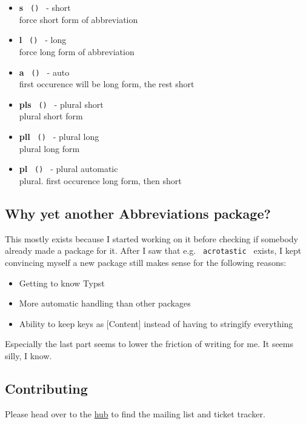 \begin{itemize}
\tightlist
\item
  \textbf{s} \texttt{\ ()\ } - short\\
  force short form of abbreviation
\item
  \textbf{l} \texttt{\ ()\ } - long\\
  force long form of abbreviation
\item
  \textbf{a} \texttt{\ ()\ } - auto\\
  first occurence will be long form, the rest short
\item
  \textbf{pls} \texttt{\ ()\ } - plural short\\
  plural short form
\item
  \textbf{pll} \texttt{\ ()\ } - plural long\\
  plural long form
\item
  \textbf{pl} \texttt{\ ()\ } - plural automatic\\
  plural. first occurence long form, then short
\end{itemize}

\subsection{Why yet another Abbreviations
package?}\label{why-yet-another-abbreviations-package}

This mostly exists because I started working on it before checking if
somebody already made a package for it. After I saw that e.g.
\texttt{\ acrotastic\ } exists, I kept convincing myself a new package
still makes sense for the following reasons:

\begin{itemize}
\tightlist
\item
  Getting to know Typst
\item
  More automatic handling than other packages
\item
  Ability to keep keys as {[}Content{]} instead of having to stringify
  everything
\end{itemize}

Especially the last part seems to lower the friction of writing for me.
It seems silly, I know.

\subsection{Contributing}\label{contributing}

Please head over to the \href{https://sr.ht/~slowjo/typst-packages}{hub}
to find the mailing list and ticket tracker.

